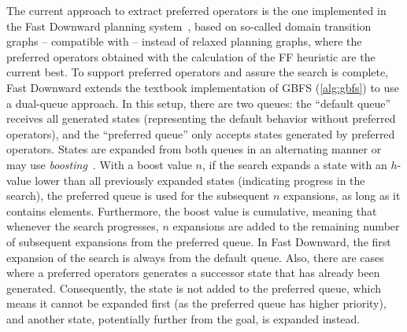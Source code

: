 \documentclass[ppgc,diss,english]{iiufrgs}
\newcommand{\ppi}[2][inline]{\todo[color=purple!50,linecolor={purple!100},#1,fancyline,author=Pedro]{#2}}
\begin{document}
The current approach to extract preferred operators is the one implemented in the Fast Downward planning system~\cite{Helmert/2009}, based on so-called domain transition graphs -- compatible with \sas -- instead of relaxed planning graphs, where the preferred operators obtained with the calculation of the FF heuristic are the current best. %
To support preferred operators and assure the search is complete, Fast Downward extends the textbook implementation of GBFS (\cref{alg:gbfs}) to use a dual-queue approach. In this setup, there are two queues: the ``default queue'' receives all generated states (representing the default behavior without preferred operators), and the ``preferred queue'' only accepts states generated by preferred operators. States are expanded from both queues in an alternating manner or may use \emph{boosting}~\cite{Richter.Helmert/2009}. With a boost value $n$, if the search expands a state with an $h$-value lower than all previously expanded states (indicating progress in the search), the preferred queue is used for the subsequent $n$ expansions, as long as it contains elements. Furthermore, the boost value is cumulative, meaning that whenever the search progresses, $n$ expansions are added to the remaining number of subsequent expansions from the preferred queue. In Fast Downward, the first expansion of the search is always from the default queue. Also, there are cases where a preferred operators generates a successor state that has already been generated. Consequently, the state is not added to the preferred queue, which means it cannot be expanded first (as the preferred queue has higher priority), and another state, potentially further from the goal, is expanded instead.
\end{document}

